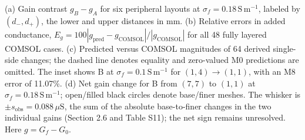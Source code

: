 (a) Gain contrast $g_B-g_A$ for six peripheral layouts at $\sigma_f=0.18\,\mathrm{S\,m^{-1}}$, labeled by $(d_-,d_+)$, the lower and upper distances in mm. (b) Relative errors in added conductance, $E_g=100|g_{\mathrm{pred}}-g_{\mathrm{COMSOL}}|/|g_{\mathrm{COMSOL}}|$ for all 48 fully layered COMSOL cases. (c) Predicted versus COMSOL magnitudes of 64 derived single-side changes; the dashed line denotes equality and zero-valued M0 predictions are omitted. The inset shows B at $\sigma_f=0.1\,\mathrm{S\,m^{-1}}$ for $(1,4)\rightarrow(1,1)$, with an M8 error of 11.07\%. (d) Net gain change for B from $(7,7)$ to $(1,1)$ at $\sigma_f=0.18\,\mathrm{S\,m^{-1}}$; open/filled black circles denote base/finer meshes. The whisker is $\pm s_{\mathrm{obs}}=0.088\,\mu\mathrm{S}$, the sum of the absolute base-to-finer changes in the two individual gains (Section 2.6 and Table S11); the net sign remains unresolved. Here $g=G_f-G_0$.
